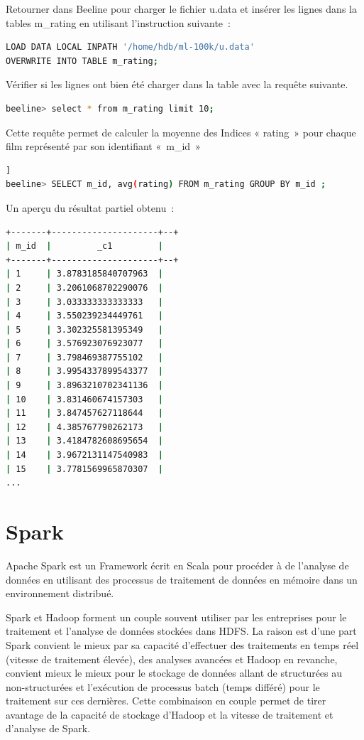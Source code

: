 \documentclass[12pt,english]{book}
\begin{document}
Retourner dans Beeline pour charger le fichier u.data et insérer les lignes dans la tables m\_rating en utilisant l’instruction suivante :

\begin{lstlisting}[language=bash, frame=single]
LOAD DATA LOCAL INPATH '/home/hdb/ml-100k/u.data'
OVERWRITE INTO TABLE m_rating;
\end{lstlisting}

Vérifier si les lignes ont bien été charger dans la table avec la requête suivante.

\begin{lstlisting}[language=bash, frame=single]
beeline> select * from m_rating limit 10;
\end{lstlisting}

Cette requête permet de calculer la moyenne des Indices « rating » pour chaque film représenté par son identifiant « m\_id » 

\begin{lstlisting}[language=bash, frame=single, breaklines=true, postbreak=\mbox{\textcolor{red}{$\hookrightarrow$}\space}]]
beeline> SELECT m_id, avg(rating) FROM m_rating GROUP BY m_id ;
\end{lstlisting}

Un aperçu du résultat partiel obtenu :

\begin{lstlisting}[language=bash, frame=single]
+-------+---------------------+--+
| m_id  |         _c1         |
+-------+---------------------+--+
| 1     | 3.8783185840707963  |
| 2     | 3.2061068702290076  |
| 3     | 3.033333333333333   |
| 4     | 3.550239234449761   |
| 5     | 3.302325581395349   |
| 6     | 3.576923076923077   |
| 7     | 3.798469387755102   |
| 8     | 3.9954337899543377  |
| 9     | 3.8963210702341136  |
| 10    | 3.831460674157303   |
| 11    | 3.847457627118644   |
| 12    | 4.385767790262173   |
| 13    | 3.4184782608695654  |
| 14    | 3.9672131147540983  |
| 15    | 3.7781569965870307  |
...
\end{lstlisting}

\section{Spark}

Apache Spark est un Framework écrit en Scala pour procéder à de l’analyse de données en utilisant des processus de traitement de données en mémoire dans un environnement distribué.

Spark et Hadoop forment un couple souvent utiliser par les entreprises pour le traitement et l’analyse de données stockées dans HDFS. La raison est d’une part Spark convient le mieux par sa capacité d’effectuer des traitements en temps réel (vitesse de traitement élevée), des analyses avancées et Hadoop en revanche, convient mieux le mieux pour le stockage de données allant de structurées au non-structurées et l’exécution de processus batch (temps différé) pour le traitement sur ces dernières.
Cette combinaison en couple permet de tirer avantage de la capacité de stockage d’Hadoop et la vitesse de traitement et d’analyse de Spark.    
\end{document}
